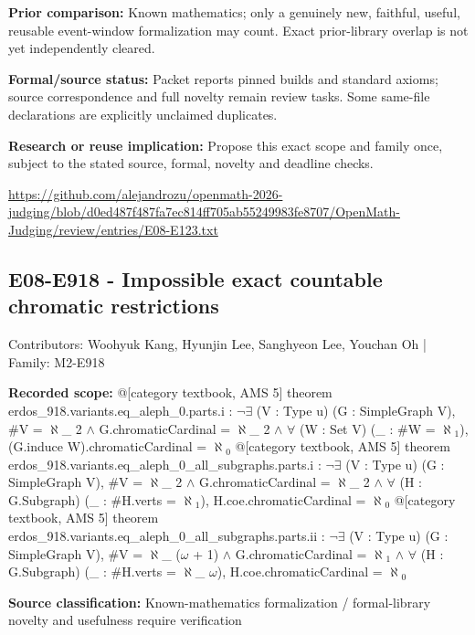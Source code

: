 \documentclass[11pt,a4paper]{article}
\begin{document}
\textbf{Prior comparison:} Known mathematics; only a genuinely new, faithful, useful, reusable event-window formalization may count. Exact prior-library overlap is not yet independently cleared.

\textbf{Formal/source status:} Packet reports pinned builds and standard axioms; source correspondence and full novelty remain review tasks. Some same-file declarations are explicitly unclaimed duplicates.

\textbf{Research or reuse implication:} Propose this exact scope and family once, subject to the stated source, formal, novelty and deadline checks.

{\small \url{https://github.com/alejandrozu/openmath-2026-judging/blob/d0ed487f487fa7ec814ff705ab55249983fe8707/OpenMath-Judging/review/entries/E08-E123.txt}\par}

\begin{samepage}
\subsection{E08-E918  -  Impossible exact countable chromatic restrictions}
{\small Contributors: Woohyuk Kang, Hyunjin Lee, Sanghyeon Lee, Youchan Oh | Family: M2-E918\par}

\textbf{Recorded scope:} @[category textbook, AMS 5] theorem erdos\_918.variants.eq\_aleph\_0.parts.i : \ensuremath{\neg}\ensuremath{\exists} (V : Type u) (G : SimpleGraph V), \#V = \ensuremath{\aleph}\_ 2 \ensuremath{\wedge} G.chromaticCardinal = \ensuremath{\aleph}\_ 2 \ensuremath{\wedge} \ensuremath{\forall} (W : Set V) (\_ : \#W = \ensuremath{\aleph}\ensuremath{_1}), (G.induce W).chromaticCardinal = \ensuremath{\aleph}\ensuremath{_0}
@[category textbook, AMS 5] theorem erdos\_918.variants.eq\_aleph\_0\_all\_subgraphs.parts.i : \ensuremath{\neg}\ensuremath{\exists} (V : Type u) (G : SimpleGraph V), \#V = \ensuremath{\aleph}\_ 2 \ensuremath{\wedge} G.chromaticCardinal = \ensuremath{\aleph}\_ 2 \ensuremath{\wedge} \ensuremath{\forall} (H : G.Subgraph) (\_ : \#H.verts = \ensuremath{\aleph}\ensuremath{_1}), H.coe.chromaticCardinal = \ensuremath{\aleph}\ensuremath{_0}
@[category textbook, AMS 5] theorem erdos\_918.variants.eq\_aleph\_0\_all\_subgraphs.parts.ii : \ensuremath{\neg}\ensuremath{\exists} (V : Type u) (G : SimpleGraph V), \#V = \ensuremath{\aleph}\_ (\ensuremath{\omega} + 1) \ensuremath{\wedge} G.chromaticCardinal = \ensuremath{\aleph}\ensuremath{_1} \ensuremath{\wedge} \ensuremath{\forall} (H : G.Subgraph) (\_ : \#H.verts = \ensuremath{\aleph}\_ \ensuremath{\omega}), H.coe.chromaticCardinal = \ensuremath{\aleph}\ensuremath{_0}


\end{samepage}
\textbf{Source classification:} Known-mathematics formalization / formal-library novelty and usefulness require verification
\end{document}
